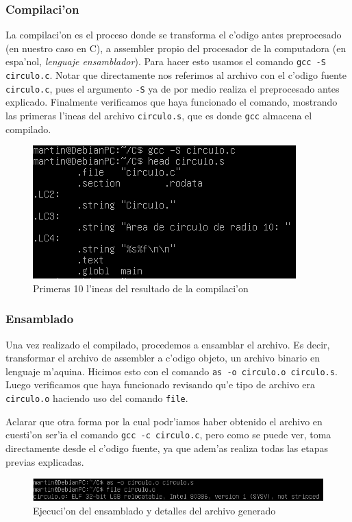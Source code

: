 \documentclass[11pt]{article}
\begin{document}
	\subsubsection{Compilaci'on}
		La compilaci'on es el proceso donde se transforma el c'odigo antes preprocesado (en nuestro caso en C), a assembler propio del procesador de la computadora (en espa'nol, \textit{lenguaje ensamblador}). Para hacer esto usamos el comando \texttt{gcc -S circulo.c}. Notar que directamente nos referimos al archivo con el c'odigo fuente \texttt{circulo.c}, pues el argumento \texttt{-S} ya de por medio realiza el preprocesado antes explicado. Finalmente verificamos que haya funcionado el comando, mostrando las primeras l'ineas del archivo \texttt{circulo.s}, que es donde \texttt{gcc} almacena el compilado.

		\begin{figure}[H]
			\centering
			\includegraphics[width=.7\linewidth]{Images/Seccion 1/S1 parte tres.PNG}
			\caption{Primeras 10 l'ineas del resultado de la compilaci'on}
			\label{fig:complex-compilation}
		\end{figure}
		
	\subsubsection{Ensamblado}
		Una vez realizado el compilado, procedemos a ensamblar el archivo. Es decir, transformar el archivo de assembler a c'odigo objeto, un archivo binario en lenguaje m'aquina. Hicimos esto con el comando \texttt{as -o circulo.o circulo.s}. Luego verificamos que haya funcionado revisando qu'e tipo de archivo era \texttt{circulo.o} haciendo uso del comando \texttt{file}.
		
		Aclarar que otra forma por la cual podr'iamos haber obtenido el archivo en cuesti'on ser'ia el comando \texttt{gcc -c circulo.c}, pero como se puede ver, toma directamente desde el c'odigo fuente, ya que adem'as realiza todas las etapas previas explicadas.
		
		\begin{figure}[H]
			\centering
			\includegraphics[width=.9\linewidth]{Images/Seccion 1/S1 parte cuatro}
			\caption{Ejecuci'on del ensamblado y detalles del archivo generado}
			\label{fig:complex-assembly}
		\end{figure}
	
\end{document}
